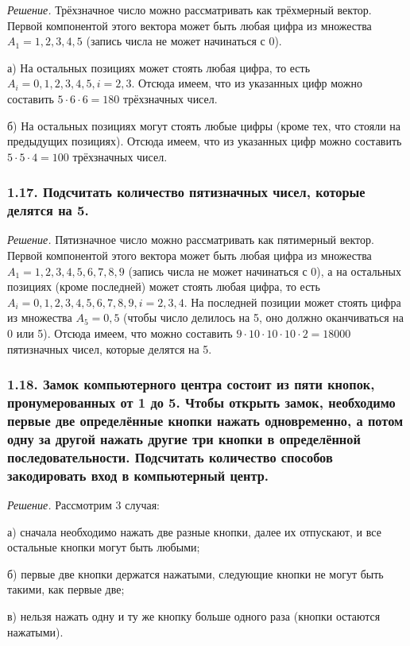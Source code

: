 \documentclass{book}
\begin{document}
\textit{Решение.} Трёхзначное число можно рассматривать как трёхмерный вектор. Первой компонентой этого вектора может быть любая цифра из множества $A_1={1, 2, 3, 4, 5}$ (запись числа не может начинаться с 0).

а) На остальных позициях может стоять любая цифра, то есть $A_i={0, 1, 2, 3, 4, 5}, i=2, 3$. Отсюда имеем, что из указанных цифр можно составить $5\cdot 6\cdot 6=180$ трёхзначных чисел.

б) На остальных позициях могут стоять любые цифры (кроме тех, что стояли на предыдущих позициях). Отсюда имеем, что из указанных цифр можно составить $5\cdot 5\cdot 4=100$ трёхзначных чисел.

\subsubsection*{1.17. Подсчитать количество пятизначных чисел, которые делятся на 5.}

\textit{Решение.} Пятизначное число можно рассматривать как пятимерный вектор. Первой компонентой этого вектора может быть любая цифра из множества $A_1={1, 2, 3, 4, 5, 6, 7, 8, 9}$ (запись числа не может начинаться с 0), а на остальных позициях (кроме последней) может стоять любая цифра, то есть $A_i={0, 1, 2, 3, 4, 5, 6, 7, 8, 9}, i=2, 3, 4$. На последней позиции может стоять цифра из множества $A_5={0, 5}$ (чтобы число делилось на 5, оно должно оканчиваться на 0 или 5). Отсюда имеем, что можно составить $9\cdot 10\cdot 10\cdot 10\cdot 2=18000$ пятизначных чисел, которые делятся на 5.

\subsubsection*{1.18. Замок компьютерного центра состоит из пяти кнопок, пронумерованных от 1 до 5. Чтобы открыть замок, необходимо первые две определённые кнопки нажать одновременно, а потом одну за другой нажать другие три кнопки в определённой последовательности. Подсчитать количество способов закодировать вход в компьютерный центр.}

\textit{Решение.} Рассмотрим 3 случая: 

а) сначала необходимо нажать две разные кнопки, далее их отпускают, и все остальные кнопки могут быть любыми; 

б) первые две кнопки держатся нажатыми, следующие кнопки не могут быть такими, как первые две; 

в) нельзя нажать одну и ту же кнопку больше одного раза (кнопки остаются нажатыми).
\end{document}

